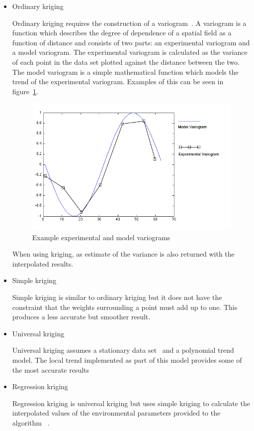 \begin{itemize}
	\item Ordinary kriging

		Ordinary kriging requires the construction of a variogram~\cite{ordinarykriging}. A variogram is a function which describes the degree of dependence of a spatial field as a function of distance and consists of two parts: an experimental variogram and a model variogram. The experimental variogram is calculated as the variance of each point in the data set plotted against the distance between the two. The model variogram is a simple mathematical function which models the trend of the experimental variogram. Examples of this can be seen in figure~\ref{fig:ordinarykrigingexample}.

		\begin{figure}[H]
        	\begin{center}
                \includegraphics[scale=0.75]{./images/mpp1/KrigingModelFunction.png}
                \caption{Example experimental and model variograms}
                \label{fig:ordinarykrigingexample}
        	\end{center}
		\end{figure}

		When using kriging, as estimate of the variance is also returned with the interpolated results.

	\item Simple kriging

		Simple kriging is similar to ordinary kriging but it does not have the constraint that the weights surrounding a point must add up to one. This produces a less accurate but smoother result. ~\cite{simplekriging}

	\item Universal kriging

		Universal kriging assumes a stationary data set~\cite{universalkriging} and a polynomial trend model. The local trend implemented as part of this model provides some of the most accurate results

	\item Regression kriging

		Regression kriging is universal kriging but uses simple kriging to calculate the interpolated values of the environmental parameters provided to the algorithm ~\cite{regressionkriging}. 

\end{itemize}



